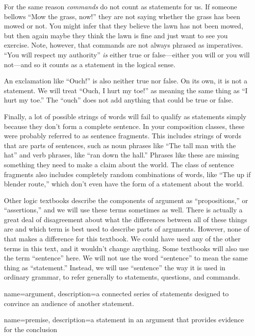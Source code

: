 For the same reason \emph{commands} do not count as statements for us. If someone bellows ``Mow the grass, now!'' they are not saying whether the grass has been mowed or not. You might infer that they believe the lawn has not been mowed, but then again maybe they think the lawn is fine and just want to see you exercise. Note, however, that commands are not always phrased as imperatives. ``You will respect my authority'' \emph{is} either true or false---either you will or you will not---and so it counts as a statement in the logical sense.

An exclamation like ``Ouch!'' is also neither true nor false. On its own, it is not a statement. We will treat ``Ouch, I hurt my toe!'' as meaning the same thing as ``I hurt my toe.'' The ``ouch'' does not add anything that could be true or false.

Finally, a lot of possible strings of words will fail to qualify as statements simply because they don't form a complete sentence. In your composition classes, these were probably referred to as sentence fragments. This includes strings of words that are parts of sentences, such as noun phrases like ``The tall man with the hat'' and verb phrases, like ``ran down the hall.'' Phrases like these are missing something they need to make a claim about the world. The class of sentence fragments also includes completely random combinations of words, like ``The up if blender route,'' which don't even have the form of a statement about the world.  

Other logic textbooks describe the components of argument as ``propositions,'' or ``assertions,'' and we will use these terms sometimes as well.  There is actually a great deal of disagreement about what the differences between all of these things are and which term is best used to describe parts of arguments. However, none of that makes a difference for this textbook. We could have used any of the other terms in this text, and it wouldn't change anything. Some textbooks will also use the term ``sentence'' here. We will not use the word ``sentence'' to mean the same thing as ``statement.'' Instead, we will use ``sentence'' the way it is used in ordinary grammar, to refer generally to statements, questions, and commands. 

{
name=argument,
description={a connected series of statements designed to convince an audience of another statement.}
}

{
name=premise,
description={a statement in an argument that provides evidence for the conclusion}
}

